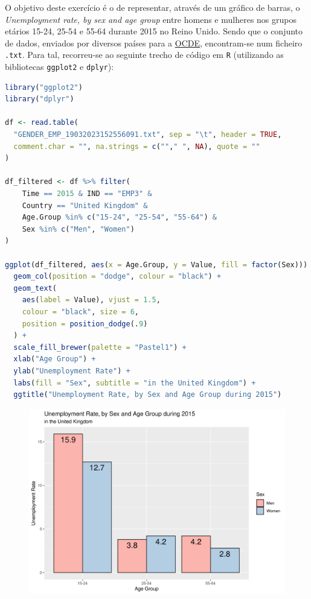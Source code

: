 \documentclass[12pt,a4paper]{article}
\begin{document}
O objetivo deste exercício é o de representar, através de um gráfico de barras, o \textit{Unemployment rate, by sex and age group}
entre homens e mulheres nos grupos etários 15-24, 25-54 e 55-64 durante 2015 no Reino Unido.
Sendo que o conjunto de dados, enviados por diversos países para a \href{https://stats.oecd.org/Index.aspx?DataSetCode=TIME_USE}{OCDE}, encontram-se num ficheiro \texttt{.txt}.
Para tal, recorreu-se ao seguinte trecho de código em \texttt{R} (utilizando as bibliotecas \texttt{ggplot2} e \texttt{dplyr}):

\quad

\begin{lstlisting}[language=R]
library("ggplot2")
library("dplyr")

df <- read.table(
  "GENDER_EMP_19032023152556091.txt", sep = "\t", header = TRUE,
  comment.char = "", na.strings = c(""," ", NA), quote = ""
)

df_filtered <- df %>% filter(
    Time == 2015 & IND == "EMP3" &
    Country == "United Kingdom" &
    Age.Group %in% c("15-24", "25-54", "55-64") &
    Sex %in% c("Men", "Women")
)

ggplot(df_filtered, aes(x = Age.Group, y = Value, fill = factor(Sex))) +
  geom_col(position = "dodge", colour = "black") +
  geom_text(
    aes(label = Value), vjust = 1.5,
    colour = "black", size = 6,
    position = position_dodge(.9)
  ) +
  scale_fill_brewer(palette = "Pastel1") +
  xlab("Age Group") +
  ylab("Unemployment Rate") +
  labs(fill = "Sex", subtitle = "in the United Kingdom") +
  ggtitle("Unemployment Rate, by Sex and Age Group during 2015")
\end{lstlisting}

\quad

\begin{figure}[h]
  \centering
  \includegraphics[scale = 0.8]{./ex03.png}
\end{figure}
\end{document}
